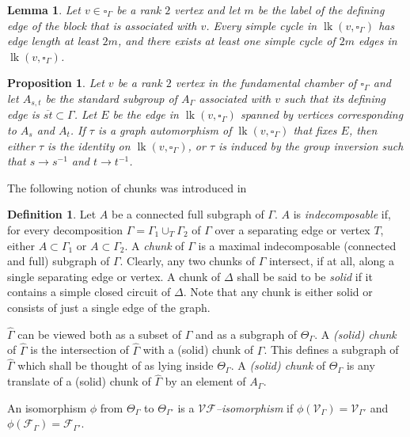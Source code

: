 \documentclass[11pt]{amsart}
\newcommand{\lk}{\operatorname{lk}}
\newcommand {\V}{\mathcal V}
\newcommand {\F}{\mathcal F}
\newtheorem{lemma}[theorem]{Lemma}
\newtheorem{prop}[theorem]{Proposition}
\theoremstyle{definition}
\newtheorem{definition}[theorem]{Definition}
\begin{document}
\begin{lemma}
	\label{lem:cycle in links}
\cite[Lemma 39]{MR2174269} 
Let $v\in \square_\Gamma$ be a rank $2$ vertex and let $m$ be the label of the defining edge of the block that is associated with $v$.
Every simple cycle in $\lk(v,\square_\Gamma)$ has edge length at least $2m$, and there exists at least one simple cycle of $2m$ edges in $\lk(v,\square_\Gamma)$.
\end{lemma}

\begin{prop}
	\label{prop:local rigid}
\cite[Proposition 40]{MR2174269} 
Let $v$ be a rank $2$ vertex in the fundamental chamber of $\square_\Gamma$ and let $A_{s,t}$ be the standard subgroup of $A_\Gamma$ associated with $v$ such that its defining edge is $\overline{st}\subset\Gamma$. Let $E$ be the edge in $\lk(v,\square_\Gamma)$ spanned by vertices corresponding to $A_s$ and $A_t$. If $\tau$ is a graph automorphism of $\lk(v,\square_\Gamma)$ that fixes $E$, then either $\tau$ is the identity on $\lk(v,\square_\Gamma)$, or $\tau$ is induced by the group inversion such that $s\to s^{-1}$ and $t\to t^{-1}$.
\end{prop}

The following notion of chunks was introduced in \cite[Section 7]{MR2174269}
\begin{definition}
Let $A$ be a connected full subgraph of $\Gamma$. $A$ is \emph{indecomposable} if, for every decomposition $\Gamma=\Gamma_1\cup_T\Gamma_2$ of $\Gamma$ over a separating edge or vertex $T$, either $A\subset\Gamma_1$ or $A\subset\Gamma_2$. A \emph{chunk} of $\Gamma$ is a maximal indecomposable (connected and full) subgraph of $\Gamma$. Clearly, any two chunks of $\Gamma$ intersect, if at all, along a single separating edge or vertex. A chunk of $\Delta$ shall be said to be \emph{solid} if it contains a simple closed circuit of $\Delta$. Note that any chunk is either solid or consists of just a single edge of the graph.

$\widehat \Gamma$ can be viewed both as a subset of $\Gamma$ and as a subgraph of $\Theta_\Gamma$. A \emph{(solid) chunk} of $\widehat \Gamma$ is the intersection of $\widehat \Gamma$ with a (solid) chunk of $\Gamma$. This defines a subgraph of $\widehat \Gamma$ which shall be thought of as lying inside $\Theta_\Gamma$. A \emph{(solid) chunk} of $\Theta_\Gamma$ is any translate of a (solid) chunk of $\widehat \Gamma$ by an element of $A_\Gamma$. 
\end{definition}

An isomorphism $\phi$ from $\Theta_\Gamma$ to $\Theta_{\Gamma'}$ is a \emph{$\V\F$--isomorphism} if $\phi(\V_\Gamma)=\V_{\Gamma'}$ and $\phi(\F_\Gamma)=\F_{\Gamma'}$.
\end{document}

